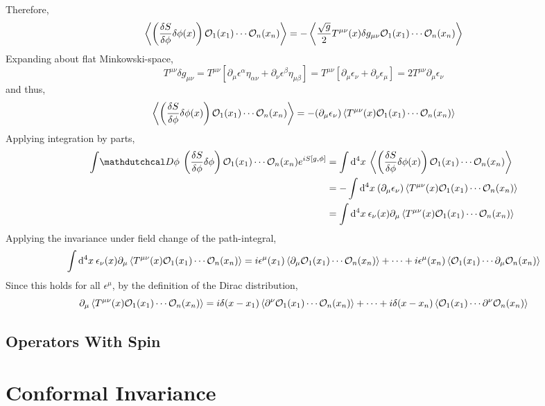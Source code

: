 \documentclass[12pt]{extarticle}
\begin{document}
Therefore,
\[ \left< \left( \frac{\delta S}{\delta \phi} \delta \phi(x) \right) \mathcal{O}_1(x_1) \cdots \mathcal{O}_n(x_n) \right> = - \left< \frac{\sqrt{g}}{2} T^{\mu \nu}(x) \delta g_{\mu \nu} \mathcal{O}_1(x_1) \cdots \mathcal{O}_n(x_n) \right> \]
Expanding about flat Minkowski-space, 
\[ T^{\mu \nu} \delta g_{\mu \nu} = T^{\mu \nu} \left[ \partial_\mu \epsilon^\alpha \eta_{\alpha \nu} + \partial_\nu \epsilon^\beta \eta_{\mu \beta} \right] = T^{\mu \nu} \left[ \partial_\mu \epsilon_\nu + \partial_\nu \epsilon_\mu \right] = 2 T^{\mu \nu} \partial_\mu \epsilon_\nu \]
and thus,
\[ \left< \left( \frac{\delta S}{\delta \phi} \delta \phi(x) \right) \mathcal{O}_1(x_1) \cdots \mathcal{O}_n(x_n) \right> = - (\partial_\mu \epsilon_\nu) \left< T^{\mu \nu}(x) \mathcal{O}_1(x_1) \cdots \mathcal{O}_n(x_n) \right> \]
Applying integration by parts, 
\begin{align*}
\int \pathd{\phi} \left(  \frac{\delta S}{\delta \phi} \delta \phi \right) \Op_1(x_1) \cdots \Op_n(x_n) e^{i S[g, \phi]} & = \int \dn{4}{x} \EV{\left( \frac{\delta S}{\delta \phi} \delta \phi(x) \right) \Op_1(x_1) \cdots \Op_n(x_n)}
\\
& = -\int \dn{4}{x} (\partial_\mu \epsilon_\nu) \EV{T^{\mu \nu}(x) \Op_1(x_1) \cdots \Op_n(x_n)}
\\
& = \int \dn{4}{x} \epsilon_\nu(x) \partial_\mu \EV{T^{\mu \nu}(x) \Op_1(x_1) \cdots \Op_n(x_n)}
\end{align*}
Applying the invariance under field change of the path-integral,
\[ \int \mathrm{d}^{4} x \: \epsilon_\nu(x) \partial_\mu \left< T^{\mu \nu}(x) \mathcal{O}_1(x_1) \cdots \mathcal{O}_n(x_n) \right> = i \epsilon^\mu(x_1) \left< \partial_\mu \mathcal{O}_1(x_1) \cdots \mathcal{O}_n(x_n) \right> + \cdots + i \epsilon^\mu(x_n) \left<  \mathcal{O}_1(x_1) \cdots \partial_\mu \mathcal{O}_n(x_n) \right> \]
Since this holds for all $\epsilon^\mu$, by the definition of the Dirac distribution,
\[ \partial_\mu \left< T^{\mu \nu}(x) \mathcal{O}_1(x_1) \cdots \mathcal{O}_n(x_n) \right> = i \delta(x - x_1) \left< \partial^\nu \mathcal{O}_1(x_1) \cdots \mathcal{O}_n(x_n) \right> + \cdots + i \delta(x - x_n) \left< \mathcal{O}_1(x_1) \cdots \partial^\nu \mathcal{O}_n(x_n) \right> \]

\subsection{Operators With Spin}

\section{Conformal Invariance}
\end{document}
